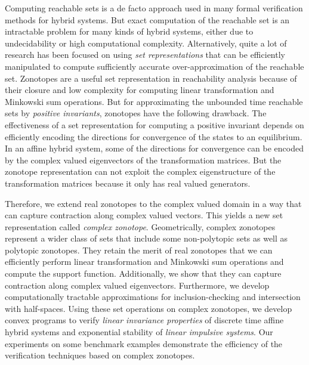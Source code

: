 Computing reachable sets is a de facto approach used in many formal
verification methods for hybrid systems.  But exact computation of the
reachable set is an intractable problem for many kinds of hybrid
systems, either due to undecidability or high computational
complexity.  Alternatively, quite a lot of research has been focused
on using \emph{set representations} that can be efficiently
manipulated to compute sufficiently accurate over-approximation of the
reachable set.  Zonotopes are a useful set representation in
reachability analysis because of their closure and low complexity for
computing linear transformation and Minkowski sum operations.  But for
approximating the unbounded time reachable sets by \emph{positive
invariants}, zonotopes have the following drawback.  The effectiveness
of a set representation for computing a positive invariant depends on
efficiently encoding the directions for convergence of the states to
an equilibrium.  In an affine hybrid system, some of the directions
for convergence can be encoded by the complex valued eigenvectors of
the transformation matrices.  But the zonotope representation can not
exploit the complex eigenstructure of the transformation matrices
because it only has real valued generators.

Therefore, we extend real zonotopes to the complex valued domain in a
way that can capture contraction along complex valued vectors.  This
yields a new set representation called \emph{complex zonotope}.
Geometrically, complex zonotopes represent a wider class of sets that
include some non-polytopic sets as well as polytopic zonotopes.  They
retain the merit of real zonotopes that we can efficiently perform
linear transformation and Minkowski sum operations and compute the
support function.  Additionally, we show that they can capture
contraction along complex valued eigenvectors.  Furthermore, we
develop computationally tractable approximations for
inclusion-checking and intersection with half-spaces.  Using these set
operations on complex zonotopes, we develop convex programs to
verify \emph{linear invariance properties} of discrete time affine
hybrid systems and exponential stability of \emph{linear impulsive
systems}.  Our experiments on some benchmark examples demonstrate the
efficiency of the verification techniques based on     complex zonotopes.
